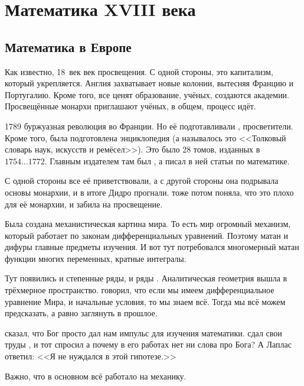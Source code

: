 \documentclass[a4paper,oneside,fleqn,10pt]{article}
\newcommand{\pe}[2]{${#1}\ldots{#2}$}
\begin{document}

\section{Математика XVIII века}

\subsection{Математика в Европе}

Как известно, 18~век век просвещения. С одной стороны, это капитализм, который укрепляется.
Англия захватывает новые колонии, вытесняя Францию и Португалию. Кроме того, все ценят образование,
учёных, создаются академии. Просвещённые монархи приглашают учёных, в общем, процесс идёт.

1789 буржуазная революция во Франции. Но её подготавливали ,  просветители.
Кроме того, была подготовлена энциклопедия (а называлось это <<Толковый словарь наук, искусств и ремёсел>>).
Это было 28 томов, изданных в \pe{1754}{1772}. Главным издателем там был , а 
писал в ней статьи по математике.

С одной стороны все её приветствовали, а с другой стороны она подрывала основы монархии, и в итоге
Дидро прогнали.  тоже потом поняла, что это плохо для её монархии, и забила на просвещение.

Была создана механистическая картина мира. То есть мир огромный механизм, который работает по законам
дифференциальных уравнений. Поэтому матан и дифуры главные предметы изучения.
И вот тут потребовался многомерный матан функции многих переменных, кратные интегралы.

Тут появились и степенные ряды, и ряды . Аналитическая геометрия вышла в трёхмерное пространство.
 говорил, что если мы имеем дифференциальное уравнение Мира, и начальные условия, то мы знаем всё.
Тогда мы всё можем предсказать, а равно заглянуть в прошлое.

 сказал, что Бог просто дал нам импульс для изучения математики.
 сдал свои труды , и тот спросил а почему в его работах нет ни слова про Бога?
А Лаплас ответил: <<Я не нуждался в этой гипотезе.>>

Важно, что в основном всё работало на механику.
\end{document}
